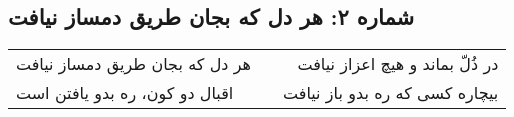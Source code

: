 \begin{center}
\section*{شماره ۲: هر دل که بجان طریق دمساز نیافت}
\label{sec:002}
\begin{longtable}{l p{0.5cm} r}
هر دل که بجان طریق دمساز نیافت
&&
در ذُلّ بماند و هیچ اعزاز نیافت
\\
اقبال دو کون، ره بدو یافتن است
&&
بیچاره کسی که ره بدو باز نیافت
\\
\end{longtable}
\end{center}
